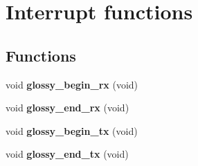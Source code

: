 \hypertarget{group__glossy__interrupts}{
\section{Interrupt functions}
\label{group__glossy__interrupts}
}
\subsection*{Functions}
\begin{DoxyCompactItemize}
\item 
\hypertarget{group__glossy__interrupts_ga82802b6993a2232c7d3bfa5f990847d5}{
void {\bfseries glossy\_\-begin\_\-rx} (void)}
\label{group__glossy__interrupts_ga82802b6993a2232c7d3bfa5f990847d5}

\item 
\hypertarget{group__glossy__interrupts_ga9eb72a239fb27960c4e3422e08967632}{
void {\bfseries glossy\_\-end\_\-rx} (void)}
\label{group__glossy__interrupts_ga9eb72a239fb27960c4e3422e08967632}

\item 
\hypertarget{group__glossy__interrupts_gaf7bf518d79b5d9abe3d5f32765c9764d}{
void {\bfseries glossy\_\-begin\_\-tx} (void)}
\label{group__glossy__interrupts_gaf7bf518d79b5d9abe3d5f32765c9764d}

\item 
\hypertarget{group__glossy__interrupts_ga0f1f14610a1d1c52083d373f0179afad}{
void {\bfseries glossy\_\-end\_\-tx} (void)}
\label{group__glossy__interrupts_ga0f1f14610a1d1c52083d373f0179afad}

\end{DoxyCompactItemize}
